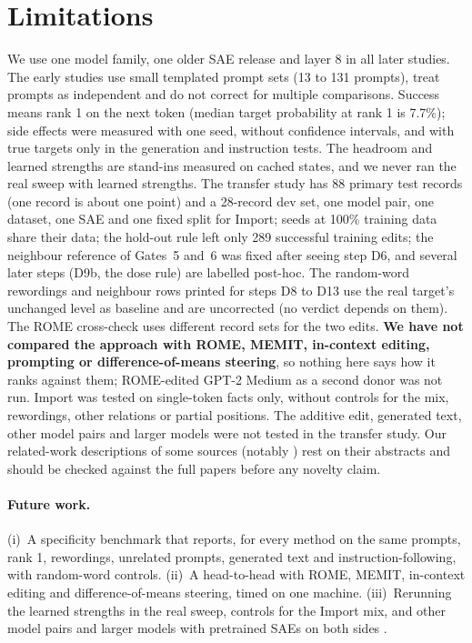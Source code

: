 \documentclass[11pt,twocolumn]{article}
\begin{document}
\section*{Limitations}
\label{sec:limits}

We use one model family, one older SAE release and layer 8 in all later studies. The early studies use small templated prompt sets (13 to 131 prompts), treat prompts as independent and do not correct for multiple comparisons. Success means rank 1 on the next token (median target probability at rank 1 is 7.7\%); side effects were measured with one seed, without confidence intervals, and with true targets only in the generation and instruction tests. The headroom and learned strengths are stand-ins measured on cached states, and we never ran the real sweep with learned strengths. The transfer study has 88 primary test records (one record is about one point) and a 28-record dev set, one model pair, one dataset, one SAE and one fixed split for Import; seeds at 100\% training data share their data; the hold-out rule left only 289 successful training edits; the neighbour reference of Gates~5 and~6 was fixed after seeing step D6, and several later steps (D9b, the dose rule) are labelled post-hoc. The random-word rewordings and neighbour rows printed for steps D8 to D13 use the real target's unchanged level as baseline and are uncorrected (no verdict depends on them). The ROME cross-check uses different record sets for the two edits. \textbf{We have not compared the approach with ROME, MEMIT, in-context editing, prompting or difference-of-means steering}, so nothing here says how it ranks against them; ROME-edited GPT-2 Medium as a second donor was not run. Import was tested on single-token facts only, without controls for the mix, rewordings, other relations or partial positions. The additive edit, generated text, other model pairs and larger models were not tested in the transfer study. Our related-work descriptions of some sources (notably \citealp{chen2025}) rest on their abstracts and should be checked against the full papers before any novelty claim.

\paragraph{Future work.} (i)~A specificity benchmark that reports, for every method on the same prompts, rank 1, rewordings, unrelated prompts, generated text and instruction-following, with random-word controls. (ii)~A head-to-head with ROME, MEMIT, in-context editing and difference-of-means steering, timed on one machine. (iii)~Rerunning the learned strengths in the real sweep, controls for the Import mix, and other model pairs and larger models with pretrained SAEs on both sides \citep{lieberum2024}.
\end{document}
